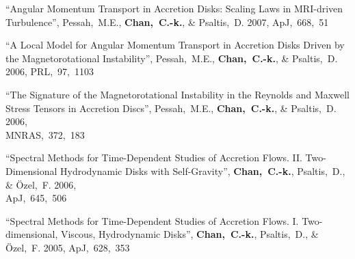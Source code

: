 \begin{ilist}
\item \sm``Angular Momentum Transport in Accretion Disks: Scaling Laws in MRI-driven Turbulence'',
  Pessah,~M.E., \textbf{Chan,~C.-k.}, \& Psaltis,~D.
  2007, ApJ,~668,~51

\item \sm``A Local Model for Angular Momentum Transport in Accretion Disks Driven by the Magnetorotational Instability'',
  Pessah,~M.E., \textbf{Chan,~C.-k.}, \& Psaltis,~D.
  2006, PRL,~97,~1103

\item \sm``The Signature of the Magnetorotational Instability in the Reynolds and Maxwell Stress Tensors in Accretion Discs'',
  Pessah,~M.E., \textbf{Chan,~C.-k.}, \& Psaltis,~D.
  2006,\\ MNRAS,~372,~183

\item \sm``Spectral Methods for Time-Dependent Studies of Accretion Flows.  II. Two-Dimensional Hydrodynamic Disks with Self-Gravity'',
  \textbf{Chan,~C.-k.}, Psaltis,~D., \& \"Ozel,~F.
  2006,\\ ApJ,~645,~506

\item \sm``Spectral Methods for Time-Dependent Studies of Accretion Flows.  I. Two-dimensional, Viscous, Hydrodynamic Disks'',
  \textbf{Chan,~C.-k.}, Psaltis,~D., \& \"Ozel,~F.
  2005, ApJ,~628,~353

\end{ilist}
